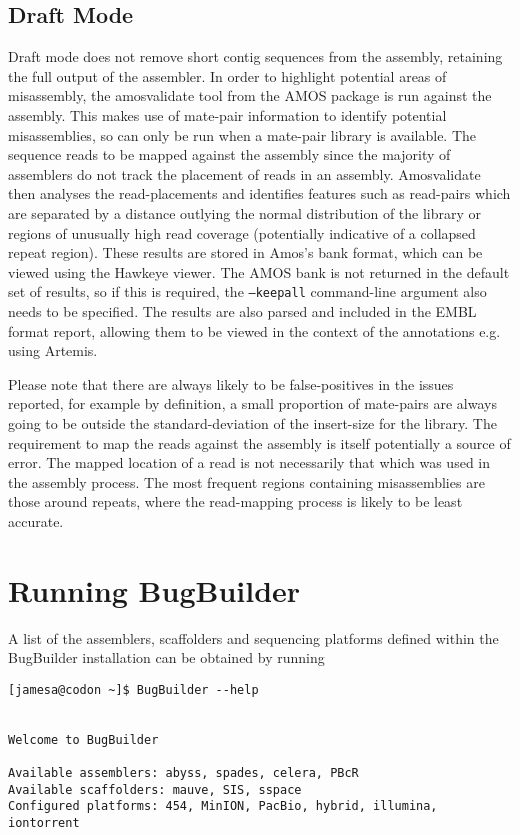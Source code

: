\documentclass[a4paper,10pt]{article}
\begin{document}
\subsection{Draft Mode}

Draft mode does not remove short contig sequences from the assembly, retaining
the full output of the assembler. In order to highlight potential areas of
misassembly, the amosvalidate tool from the AMOS package is run against the
assembly. This makes use of mate-pair information to identify potential
misassemblies, so can only be run when a mate-pair library is available. 
The sequence reads to be mapped against the assembly since the majority of
assemblers do not track the placement of reads in an assembly.  Amosvalidate
then analyses the read-placements and identifies features such as read-pairs
which are separated by a distance outlying the normal distribution of the
library or regions of unusually high read coverage (potentially indicative of a
collapsed repeat region). These results are stored in Amos's bank format, which
can be viewed using the Hawkeye viewer. The AMOS bank is not returned in the
default set of results, so if this is required, the {\tt --keepall}
command-line argument also needs to be specified. The results are also parsed
and included in the EMBL format report, allowing them to be viewed in the
context of the annotations e.g. using Artemis.

Please note that there are always likely to be false-positives in the issues
reported, for example by definition, a small proportion of mate-pairs are
always going to be outside the standard-deviation of the insert-size for the
library. The requirement to map the reads against the assembly is itself
potentially a source of error. The mapped location of a read is not necessarily
that which was used in the assembly process. The most frequent regions
containing misassemblies are those around repeats, where the read-mapping
process is likely to be least accurate. 

\section{Running BugBuilder}

A list of the assemblers, scaffolders and sequencing platforms defined within
the BugBuilder installation can be obtained by running

\begin{verbatim}
[jamesa@codon ~]$ BugBuilder --help
 

Welcome to BugBuilder

Available assemblers: abyss, spades, celera, PBcR
Available scaffolders: mauve, SIS, sspace
Configured platforms: 454, MinION, PacBio, hybrid, illumina, iontorrent

\end{verbatim}
\end{document}
